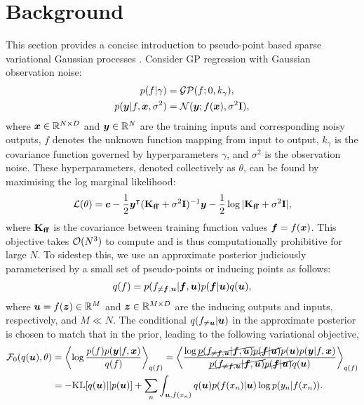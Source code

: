 \section{Background}
\label{sec:background}
This section provides a concise introduction to pseudo-point based sparse variational Gaussian processes \citep[SVGP;][]{titsias2009variational,hensman2015scalable,matthews2016sparse}. Consider GP regression with Gaussian observation noise:
\begin{align}
    p(f | \gamma) &= \mathcal{GP}(f; 0, k_\gamma),\\
    p({\bm{y}} | f, {\bm{x}}, \sigma^2) &= {\mathcal{N}}({\bm{y}}; f({\bm{x}}), \sigma^2{\mathbf{I}}),
\end{align}
where ${\bm{x}} \in {\mathbb{R}}^{N\times D}$ and ${\bm{y}} \in {\mathbb{R}}^{N}$ are the training inputs and corresponding noisy outputs, $f$ denotes the unknown function mapping from input to output, $k_\gamma$ is the covariance function governed by hyperparameters $\gamma$, and $\sigma^2$ is the observation noise. These hyperparameters, denoted collectively as $\theta$, can be found by maximising the log marginal likelihood:
\begin{align}
    {\mathcal{L}}(\theta) = {\bm{c}} - \frac{1}{2} {\bm{y}}^\intercal (\mathbf{K}_{\mathbf{ff}} + \sigma^2{\mathbf{I}})^{-1} {\bm{y}} - \frac{1}{2}\log |\mathbf{K}_{\mathbf{ff}} + \sigma^2{\mathbf{I}}|,
\end{align}
where $\mathbf{K}_{\mathbf{ff}}$ is the covariance between training function values ${\bm{f}}  = f({\bm{x}})$. 
This objective takes ${\mathcal{O}}(N^3)$ to compute and is thus computationally prohibitive for large $N$. To sidestep this, we use an approximate posterior judiciously parameterised by a small set of pseudo-points or inducing points as follows:
\begin{align}
    q(f) = p(f_{\neq {\bm{f}}, {\bm{u}}} | {\bm{f}}, {\bm{u}}) p({\bm{f}} | {\bm{u}}) q({\bm{u}}), \label{eq:titsias_q}  
\end{align}
where ${\bm{u}} = f({\bm{z}}) \in {\mathbb{R}}^{M}$ and ${\bm{z}} \in {\mathbb{R}}^{M \times D}$ are the inducing outputs and inputs, respectively, and $M \ll N$. The conditional $q(f_{\neq {\bm{u}}} | {\bm{u}})$ in the approximate posterior is chosen to match that in the prior, leading to the following variational objective,
\begin{align}
    {\mathcal{F}}_0(q({\bm{u}}), \theta) 
        &= \left \langle \log \frac {p(f) p({\bm{y}} | f, {\bm{x}}) } {q(f)} \right \rangle_{q(f)} = \left \langle \frac {\log \cancel{p(f_{\neq {\bm{f}}, {\bm{u}}} | {\bm{f}}, {\bm{u}})} \cancel{p({\bm{f}} | {\bm{u}})} p({\bm{u}}) p({\bm{y}} | f, {\bm{x}}) } {\cancel{p(f_{\neq {\bm{f}}, {\bm{u}}} | {\bm{f}}, {\bm{u}})} \cancel{p({\bm{f}} | {\bm{u}})} q({\bm{u}})} \right \rangle_{q(f)} \nonumber \\
        &= - \mathrm{KL} [q({\bm{u}}) || p({\bm{u}})] + \sum_{n} \int_{{\bm{u}}, f(x_n)} q({\bm{u}}) p(f({x_n}) | {\bm{u}}) \log p(y_n | f({x_n})). \label{eq:titsias_bound}
\end{align}
